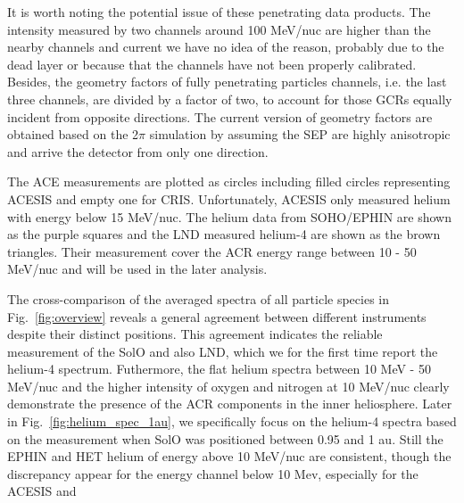 It is worth noting the potential issue of these penetrating data products. The intensity measured by two channels around 100 MeV/nuc are higher than the nearby channels and current we have no idea of the reason, probably due to the dead layer or because that the channels have not been properly calibrated.
Besides, the geometry factors of fully penetrating particles channels, i.e. the last three channels, are divided by a factor of two, to account for those \acp{GCR} equally incident from opposite directions. The current version of geometry factors are obtained based on the 2$\pi$ simulation by assuming the \ac{SEP} are highly anisotropic and arrive the detector from only one direction. 

The \ac{ACE} measurements are plotted as circles including filled circles representing \ac{ACESIS} and empty one for \ac{CRIS}. Unfortunately, \ac{ACESIS} only measured helium with energy below 15 MeV/nuc.
The helium data from \ac{SOHO}/\ac{EPHIN} are shown as the purple squares and the \ac{LND} measured helium-4 are shown as the brown triangles. Their measurement cover the \ac{ACR} energy range between 10 - 50 MeV/nuc and will be used in the later analysis.

The cross-comparison of the averaged spectra of all particle species in Fig.~\ref{fig:overview} reveals a general agreement between different instruments despite their distinct positions. This agreement indicates the reliable measurement of the \ac{SolO} and also \ac{LND}, which we for the first time report the helium-4 spectrum. Futhermore, the flat helium spectra between 10 MeV - 50 MeV/nuc and the higher intensity of oxygen and nitrogen at 10 MeV/nuc clearly demonstrate the presence of the \ac{ACR} components in the inner heliosphere. 
Later in Fig.~\ref{fig:helium_spec_1au}, we specifically focus on the helium-4 spectra based on the measurement when \ac{SolO} was positioned between 0.95 and 1 au. Still the \ac{EPHIN} and \ac{HET} helium of energy above 10 MeV/nuc are consistent, though the discrepancy appear for the energy channel below 10 Mev, especially for the \ac{ACESIS} and 


